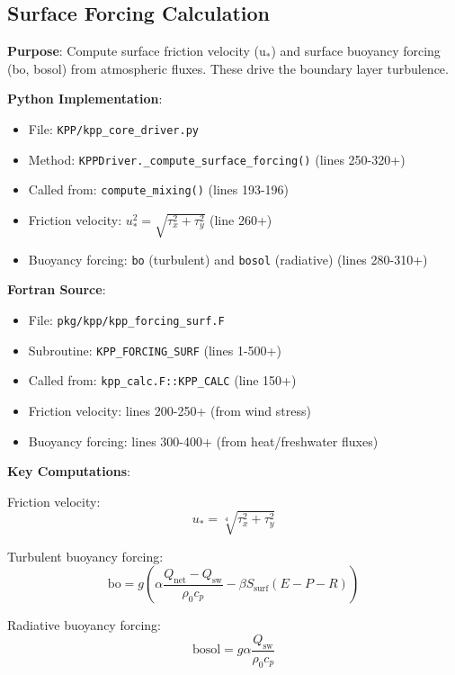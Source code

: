 \documentclass[11pt]{article}
\begin{document}
\subsection{Surface Forcing Calculation}

\textbf{Purpose}: Compute surface friction velocity (u$_*$) and surface buoyancy forcing (bo, bosol) from atmospheric fluxes. These drive the boundary layer turbulence.

\textbf{Python Implementation}:
\begin{itemize}
    \item File: \verb|KPP/kpp_core_driver.py|
    \item Method: \verb|KPPDriver._compute_surface_forcing()| (lines 250-320+)
    \item Called from: \verb|compute_mixing()| (lines 193-196)
    \item Friction velocity: $u_*^2 = \sqrt{\tau_x^2 + \tau_y^2}$ (line 260+)
    \item Buoyancy forcing: \verb|bo| (turbulent) and \verb|bosol| (radiative) (lines 280-310+)
\end{itemize}

\textbf{Fortran Source}:
\begin{itemize}
    \item File: \verb|pkg/kpp/kpp_forcing_surf.F|
    \item Subroutine: \verb|KPP_FORCING_SURF| (lines 1-500+)
    \item Called from: \verb|kpp_calc.F::KPP_CALC| (line 150+)
    \item Friction velocity: lines 200-250+ (from wind stress)
    \item Buoyancy forcing: lines 300-400+ (from heat/freshwater fluxes)
\end{itemize}

\textbf{Key Computations}:

Friction velocity:
\begin{equation}
u_* = \sqrt[4]{\tau_x^2 + \tau_y^2}
\end{equation}

Turbulent buoyancy forcing:
\begin{equation}
\text{bo} = g \left( \alpha \frac{Q_{\text{net}} - Q_{\text{sw}}}{\rho_0 c_p} - \beta S_{\text{surf}} (E - P - R) \right)
\end{equation}

Radiative buoyancy forcing:
\begin{equation}
\text{bosol} = g \alpha \frac{Q_{\text{sw}}}{\rho_0 c_p}
\end{equation}
\end{document}
